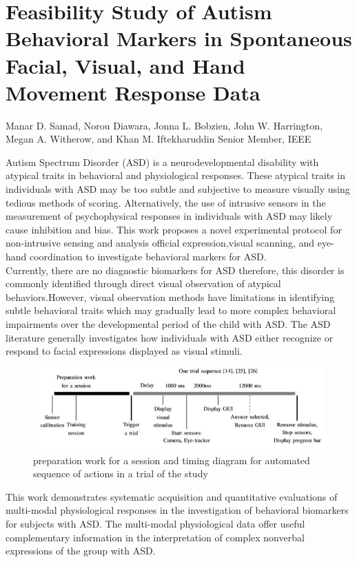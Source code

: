 \section{Feasibility Study of Autism Behavioral Markers in Spontaneous Facial, Visual, and Hand Movement Response Data}

Manar D. Samad, Norou Diawara, Jonna L. Bobzien, John W. Harrington, Megan A. Witherow, and Khan M. Iftekharuddin Senior Member, IEEE


Autism Spectrum Disorder (ASD) is a neurodevelopmental disability with atypical traits in behavioral and physiological responses. These atypical traits in individuals with ASD may be too subtle and subjective to measure visually using tedious methods of scoring. Alternatively, the use of intrusive sensors in the measurement of psychophysical responses in individuals with ASD may likely cause inhibition and bias. This work proposes a novel experimental protocol for non-intrusive sensing and analysis official expression,visual scanning, and eye-hand coordination to investigate behavioral markers for ASD. \\

 Currently, there are no diagnostic biomarkers for ASD therefore, this disorder is commonly identiﬁed through direct visual observation of atypical behaviors.However, visual observation methods have limitations in identifying subtle behavioral traits which may gradually lead to more complex behavioral impairments over the developmental period of the child with ASD.   The ASD literature generally investigates how individuals with ASD either recognize or respond to facial expressions displayed as visual stimuli.\\
 \begin{figure}[h]
\label{ss}
\centering
\includegraphics[width= 14 cm]{preparation work for a session and timing diagram for automated sequence of actions in a trial of the study.jpg}
\caption{preparation work for a session and timing diagram for automated sequence of actions in a trial of the study}
\end{figure}
 

This work demonstrates systematic acquisition and quantitative evaluations of multi-modal physiological responses in the investigation of behavioral biomarkers for subjects with ASD. The multi-modal physiological data offer useful complementary information in the interpretation of complex nonverbal expressions of the group with ASD. 


